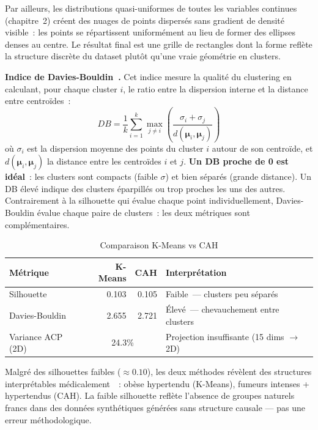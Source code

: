 Par ailleurs, les distributions quasi-uniformes de toutes les variables continues (chapitre~2) créent des nuages de points dispersés sans gradient de densité visible~: les points se répartissent uniformément au lieu de former des ellipses denses au centre. Le résultat final est une grille de rectangles dont la forme reflète la structure discrète du dataset plutôt qu'une vraie géométrie en clusters.

\textbf{Indice de Davies-Bouldin~\cite{davies1979}.} Cet indice mesure la qualité du clustering en calculant, pour chaque cluster $i$, le ratio entre la dispersion interne et la distance entre centroïdes~:
\begin{equation}
DB = \frac{1}{k}\sum_{i=1}^{k}\max_{j \neq i}\left(\frac{\sigma_i + \sigma_j}{d(\boldsymbol{\mu}_i, \boldsymbol{\mu}_j)}\right)
\end{equation}
où $\sigma_i$ est la dispersion moyenne des points du cluster $i$ autour de son centroïde, et $d(\boldsymbol{\mu}_i, \boldsymbol{\mu}_j)$ la distance entre les centroïdes $i$ et $j$. \textbf{Un DB proche de 0 est idéal}~: les clusters sont compacts (faible $\sigma$) et bien séparés (grande distance). Un DB élevé indique des clusters éparpillés ou trop proches les uns des autres. Contrairement à la silhouette qui évalue chaque point individuellement, Davies-Bouldin évalue chaque paire de clusters~: les deux métriques sont complémentaires.

\begin{table}[H]
\centering
\caption{Comparaison K-Means vs CAH}
\label{tab:clustering_eval}
\begin{tabular}{lrrl}
\toprule
Métrique & K-Means & CAH & Interprétation \\
\midrule
Silhouette      & 0.103 & 0.105 & Faible~--- clusters peu séparés \\
Davies-Bouldin  & 2.655 & 2.721 & Élevé~--- chevauchement entre clusters \\
Variance ACP (2D) & \multicolumn{2}{c}{24.3\%} & Projection insuffisante (15 dims $\to$ 2D) \\
\bottomrule
\end{tabular}
\end{table}

Malgré des silhouettes faibles ($\approx 0.10$), les deux méthodes révèlent des structures interprétables médicalement~\cite{booth2012, who2000}~: obèse hypertendu (K-Means), fumeurs intenses + hypertendus (CAH). La faible silhouette reflète l'absence de groupes naturels francs dans des données synthétiques générées sans structure causale --- pas une erreur méthodologique.

